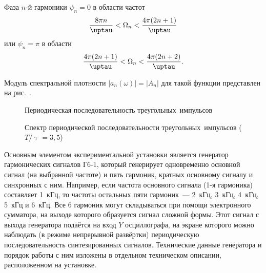 Фаза $n$-й гармоники $\psi_n=0$ в области частот
\begin{equation}
	\frac{8\pi n}{\uptau}<\Omega_n<\frac{4\pi (2n+1)}{\uptau}
	\eqmark{6.2.6}
\end{equation}
или $\psi_n=\pi$ в области
\begin{equation}
	\frac{4\pi(2n+1)}{\uptau}<\Omega_n<\frac{4\pi(2n+2)}{\uptau}.
	\eqmark{6.2.7}
\end{equation}

Модуль спектральной плотности $|a_n(\omega)|=|A_n|$ для такой функции представлен на рис.~.

\begin{figure}[t]
\begin{minipage}{0.45\textwidth}
	\caption{Периодическая последовательность треугольных~импульсов}
\end{minipage}
\hfill
\begin{minipage}{0.45\textwidth}
	\caption{Спектр периодической последовательности треугольных~импульсов ($T/\uptau=3,5$)}
\end{minipage}
\end{figure}


\experiment
Основным элементом экспериментальной установки является генератор гармонических сигналов Г6-1, который генерирует
одновременно основной сигнал (на выбранной частоте) и пять гармоник, кратных основному сигналу и синхронных с ним.
Например, если частота основного сигнала (1-я гармоника) составляет 1~кГц, то частоты остальных пяти гармоник~--- 2~кГц,
3~кГц, 4~кГц, 5~кГц и 6~кГц. Все 6 гармоник могут складываться при помощи электронного сумматора, на выходе которого
образуется сигнал сложной формы. Этот сигнал с выхода генератора подаётся на вход $Y$ осциллографа, на экране которого
можно наблюдать (в режиме непрерывной развёртки) периодическую последовательность синтезированных сигналов. Технические
данные генератора и порядок работы с ним изложены в отдельном техническом описании, расположенном на установке.

